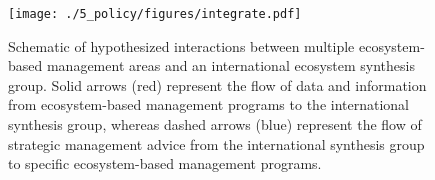 \begin{figure}[htbp]
  \centering \texttt{[image: ./5\_policy/figures/integrate.pdf]}
  \caption[Schematic of hypothesized interactions between multiple
           ecosystem-based management areas and an international ecosystem
           synthesis group.]{Schematic of hypothesized interactions between
           multiple ecosystem-based management areas and an international
           ecosystem synthesis group. Solid arrows (red) represent the flow of
           data and information from ecosystem-based management programs to the
           international synthesis group, whereas dashed arrows (blue) represent
           the flow of strategic management advice from the international
           synthesis group to specific ecosystem-based management programs.}
  \label{fig:ebm:4}
\end{figure}
